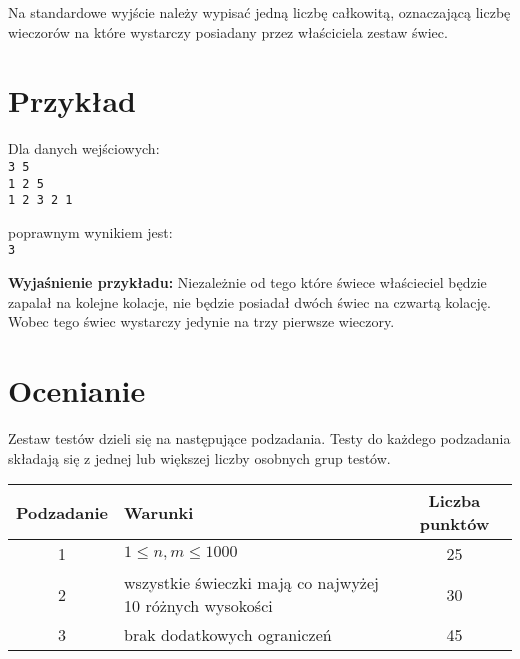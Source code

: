 \documentclass[10pt]{article}
\begin{document}
    Na standardowe wyjście należy wypisać jedną liczbę całkowitą, oznaczającą liczbę wieczorów na które wystarczy posiadany przez właściciela zestaw świec.


    \section*{Przykład}
    
    \noindent
    \begin{minipage}[t]{0.5\textwidth}
        Dla danych wejściowych:\vspace{1ex}\\
        \texttt{3 5\\1 2 5\\1 2 3 2 1}
    \end{minipage}
    \begin{minipage}[t]{0.5\textwidth}
        poprawnym wynikiem jest:\vspace{1ex}\\
        \texttt{3}
    \end{minipage}
    
    \vspace{2ex}
    \noindent\textbf{Wyjaśnienie przykładu:} Niezależnie od tego które świece właścieciel będzie zapalał na kolejne kolacje, nie będzie posiadał dwóch świec na czwartą kolację. Wobec tego świec wystarczy jedynie na trzy pierwsze wieczory.
    
    

    \section*{Ocenianie}
        
    Zestaw testów dzieli się na następujące podzadania. Testy do każdego podzadania składają się z jednej lub większej liczby osobnych grup testów.
    
    \begin{center}
        \begin{tabular}{ |c|p{9cm}|c| }
            \hline
            \textbf{Podzadanie} & \textbf{Warunki} & \textbf{Liczba punktów}\\
            \hline
            1 & $1 \leq n, m \leq 1000$ & 25\\
            \hline
            2 & wszystkie świeczki mają co najwyżej 10 różnych wysokości & 30\\
            \hline
            3 & brak dodatkowych ograniczeń & 45\\
            \hline
        \end{tabular}
    \end{center}
\end{document}
